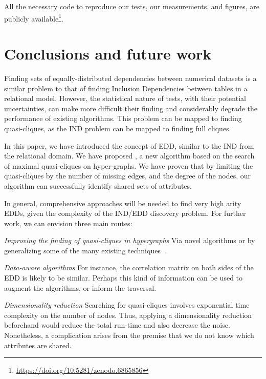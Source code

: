 All the necessary code to reproduce our tests, our
measurements, and figures, are publicly available\footnote{\url{https://doi.org/10.5281/zenodo.6865856}}.

\section{Conclusions and future work}
\label{sec:presq_conclusions}
Finding sets of equally-distributed dependencies between numerical datasets
is a similar problem to that of finding Inclusion Dependencies between tables
in a relational model. However, the statistical nature of tests, with their
potential uncertainties, can make more difficult their finding and considerably
degrade the performance of existing algorithms.
This problem can be mapped to finding quasi-cliques, as the IND problem can be mapped
to finding full cliques.

In this paper, we have introduced the concept of EDD, similar to the IND from the relational
domain. We have proposed \PresQ, a new algorithm based on the search of maximal quasi-cliques
on hyper-graphs. We have proven that by limiting the quasi-cliques by the number of missing
edges, and the degree of the nodes, our algorithm can successfully
identify shared sets of attributes.

In general, comprehensive approaches will be needed to
find very high arity EDDs, given the complexity of the IND/EDD discovery
problem. For further work, we can envision three main routes:

\emph{Improving the finding of quasi-cliques in hypergraphs} Via novel algorithms
    or by generalizing some of the many existing techniques~\cite{WU2015693}.

\emph{Data-aware algorithms} For instance, the correlation matrix on both sides of
    the EDD is likely to be similar. Perhaps this kind of information can be used to
    augment the algorithms, or inform the traversal.

\emph{Dimensionality reduction} Searching for quasi-cliques involves exponential
    time complexity on the number of nodes. Thus, applying a dimensionality reduction beforehand
    would reduce the total run-time and also decrease the noise. Nonetheless, a complication
    arises from the premise that we do not know which attributes are shared.
